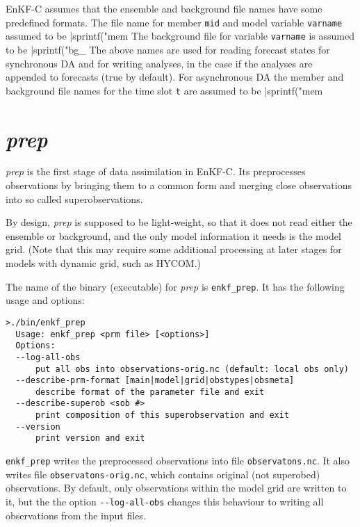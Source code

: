 \documentclass[11pt]{report}
\begin{document}
EnKF-C assumes that the ensemble and background file names have some predefined formats.
The file name for member \verb|mid| and model variable \verb|varname| assumed to be \spverb|sprintf("mem%
The background file for variable \verb|varname| is assumed to be \spverb|sprintf("bg_%
The above names are used for reading forecast states for synchronous DA and for writing analyses, in the case if the analyses are appended to forecasts (true by default).
For asynchronous DA the member and background file names for the time slot \verb|t| are assumed to be \spverb|sprintf("mem%

\section{\emph{prep}}

\emph{prep} is the first stage of data assimilation in EnKF-C.
Its preprocesses observations by bringing them to a common form and merging close observations into so called superobservations.

By design, \emph{prep} is supposed to be light-weight, so that it does not read either the ensemble or background, and the only model information it needs is the model grid. 
(Note that this may require some additional processing at later stages for models with dynamic grid, such as HYCOM.)

The name of the binary (executable) for \emph{prep} is \verb|enkf_prep|.
It has the following usage and options:
\begin{Verbatim}[frame=single,fontsize=\footnotesize]
>./bin/enkf_prep
  Usage: enkf_prep <prm file> [<options>]
  Options:
  --log-all-obs
      put all obs into observations-orig.nc (default: local obs only)
  --describe-prm-format [main|model|grid|obstypes|obsmeta]
      describe format of the parameter file and exit
  --describe-superob <sob #>
      print composition of this superobservation and exit
  --version
      print version and exit
\end{Verbatim}

\verb|enkf_prep| writes the preprocessed observations into file \verb|observatons.nc|.
It also writes file \verb|observatons-orig.nc|, which contains original (not superobed) observations.
By default, only observations within the model grid are written to it, but the the option \verb|--log-all-obs| changes this behaviour to writing all observations from the input files.
\end{document}
